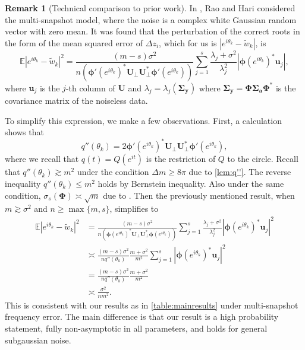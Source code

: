 \documentclass[11pt]{article}
\theoremstyle{definition}
\newtheorem{remark}[theorem]{Remark}
\numberwithin{theorem}{section}
\numberwithin{equation}{section}
\def\E{\mathbb{E}}
\renewcommand{\tilde}{\widetilde}
\newcommand{\bfa}{{\boldsymbol a}}
\newcommand{\bfu}{{\boldsymbol u}}
\newcommand{\bfy}{{\boldsymbol y}}
\newcommand{\bfU}{{\boldsymbol U}}
\newcommand{\bfphi}{{\boldsymbol \phi}}
\newcommand{\bfPhi}{{\boldsymbol \Phi}}
\newcommand{\bfSigma}{{\boldsymbol \Sigma}}
\numberwithin{equation}{section}
\begin{document}
\begin{remark}[Technical comparison to prior work]
    \label{rem:techcomparison} 
    In \cite{rao1989performance}, Rao and Hari considered the multi-snapshot model, where the noise is a complex white Gaussian random vector with zero mean. It was found that \cite[(24), (29b)]{rao1989performance} the perturbation of the correct roots in the form of the mean squared error of $\Delta z_i$, which for us is $\left|e^{i\theta_k} - \tilde w_k\right|$, is 
    $$
    \E \left|e^{i\theta_k} - \tilde w_k\right| ^2 = \frac{(m-s)\sigma^2}{n (\bfphi'(e^{i\theta_k})^* \bfU_{\perp} \bfU_{\perp}^* \bfphi'(e^{i\theta_k}))} \sum_{j=1}^s \frac{\lambda_j + \sigma^2}{\lambda_j^2} \left|\bfphi(e^{i\theta_k})^* \bfu_j\right|, 
    $$ 
    where $\bfu_j$ is the $j$-th column of $\bfU$ and $\lambda_j = \lambda_j(\bfSigma_{\bfy})$ where $\bfSigma_{\bfy}=\bfPhi \bfSigma_{\bfa} \bfPhi^*$ is the covariance matrix of the noiseless data. 

    To simplify this expression, we make a few observations. First, a calculation shows that
    $$
    q''(\theta_k) = 2 \bfphi'(e^{i\theta_k})^* \bfU_{\perp} \bfU_{\perp}^* \bfphi'(e^{i\theta_k}), 
    $$
    where we recall that $q(t)=Q(e^{it})$ is the restriction of $Q$ to the circle. Recall that $q''(\theta_k)\gtrsim m^2$ under the condition $\Delta m \geq 8\pi$ due to \cref{lem:q''}. The reverse inequality $q''(\theta_k)\leq m^2$ holds by Bernstein inequality. Also under the same condition, $\sigma_s(\bfPhi)\asymp \sqrt m$ due to \cite{aubel2019vandermonde}. Then the previously mentioned result, when $m\gtrsim \sigma^2$ and $n\geq \max\{m,s\}$, simplifies to 
    \begin{align*}
        \E \left|e^{i\theta_k} - \tilde w_k\right| ^2 &= \frac{(m-s)\sigma^2}{n (\bfphi(e^{i\theta_k})^* \bfU_{\perp} \bfU_{\perp}^* \bfphi(e^{i\theta_k}))} \sum_{j=1}^s \frac{\lambda_j + \sigma^2}{\lambda_j^2} \left|\bfphi(e^{i\theta_k})^* \bfu_j\right|^2 \\ 
        &\asymp \frac{(m-s)\sigma^2}{n q''(\theta_k)} \frac{m + \sigma^2}{m^2} \sum_{j=1}^s \left|\bfphi(e^{i\theta_k})^* \bfu_j\right|^2 \\
        &= \frac{(m-s)\sigma^2}{n q''(\theta_k)} \frac{m + \sigma^2}{m^2} \\
        &\asymp \frac{\sigma^2}{n m^2}. 
    \end{align*}
    This is consistent with our results as in \cref{table:mainresults} under multi-snapshot frequency error. The main difference is that our result is a high probability statement, fully non-asymptotic in all parameters, and holds for general subgaussian noise. 
    

\end{remark}
\end{document}
